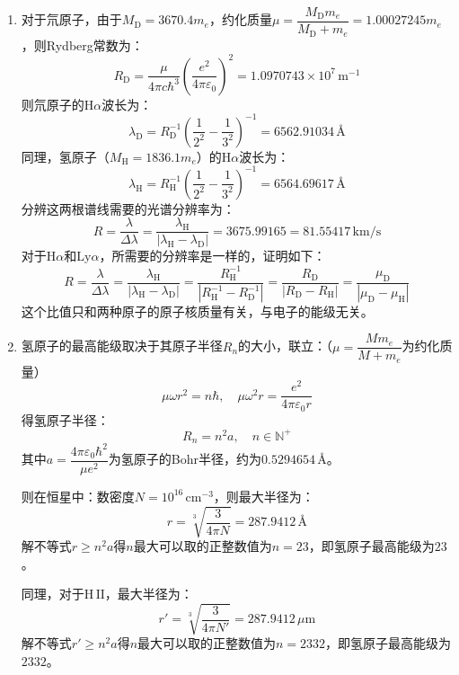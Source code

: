 \documentclass[a4paper]{article}
\renewcommand\epsilon\varepsilon
\begin{document}
\begin{enumerate}
    \bigskip
    \item[5.]
    对于氘原子，由于$M_\mathrm{D} = 3670.4m_e$，约化质量$\mu = \dfrac{M_\mathrm{D} m_e}{M_\mathrm{D} + m_e}=1.00027245m_e$，则Rydberg常数为：
    \[
        R_\mathrm{D} = \frac{\mu}{4\pi c\hbar^3}\left(\frac{e^2}{4\pi\epsilon_0}\right)^{\!2} = 1.0970743\times10^{7}\,\mathrm{m}^{-1}
    \]
    则氘原子的$\mathrm{H}\alpha$波长为：
    \[
        \lambda_\mathrm{D} = R_\mathrm{D}^{-1}\left(\frac{1}{2^2} - \frac{1}{3^2}\right)^{-1} = 6562.91034\,\text{\AA}
    \]
    同理，氢原子（$M_\mathrm{H}=1836.1m_e$）的$\mathrm{H}\alpha$波长为：
    \[
        \lambda_\mathrm{H} = R_\mathrm{H}^{-1}\left(\frac{1}{2^2} - \frac{1}{3^2}\right)^{-1} = 6564.69617\,\text{\AA}
    \]
    分辨这两根谱线需要的光谱分辨率为：
    \[
        R = \frac{\lambda}{\Delta\lambda} = \frac{\lambda_\mathrm{H}}{|\lambda_\mathrm{H} - \lambda_\mathrm{D}|} = 3675.99165 = 81.55417\,\mathrm{km/s}
    \]
    对于$\mathrm{H}\alpha$和$\mathrm{Ly}\alpha$，所需要的分辨率是一样的，证明如下：
    \[
        R = \frac{\lambda}{\Delta\lambda} = \frac{\lambda_\mathrm{H}}{|\lambda_\mathrm{H} - \lambda_\mathrm{D}|} = \frac{R_\mathrm{H}^{-1}}{|R_\mathrm{H}^{-1} - R_\mathrm{D}^{-1}|} = \frac{R_\mathrm{D}}{|R_\mathrm{D} - R_\mathrm{H}|} = \frac{\mu_\mathrm{D}}{|\mu_\mathrm{D} - \mu_\mathrm{H}|}
    \]
    这个比值只和两种原子的原子核质量有关，与电子的能级无关。

    \bigskip
    \item[6.]
    氢原子的最高能级取决于其原子半径$R_n$的大小，联立：（$\mu=\dfrac{M m_e}{M + m_e}$为约化质量）
    \[
        \mu\omega r^2 = n\hbar,\quad
        \mu\omega^2 r = \frac{e^2}{4\pi\epsilon_0 r}
    \]
    得氢原子半径：
    \[
        R_n = n^2 a,\quad
        n \in \mathbb{N}^+
    \]
    其中$a = \dfrac{4\pi\epsilon_0 \hbar^2}{\mu e^2}$为氢原子的Bohr半径，约为$0.5294654\,\text{\AA}$。

    则在恒星中：数密度$N = 10^{16}\,\mathrm{cm^{-3}}$，则最大半径为：
    \[
        r = \sqrt[3]{\frac{3}{4\pi N}} = 287.9412\,\text{\AA}
    \]
    解不等式$r \geqslant n^2 a$得$n$最大可以取的正整数值为$n=23$，即氢原子最高能级为$23$。

    同理，对于$\mathrm{H\,II}$，最大半径为：
    \[
        r' = \sqrt[3]{\frac{3}{4\pi N'}} = 287.9412\,\mu\mathrm{m}
    \]
    解不等式$r' \geqslant n^2 a$得$n$最大可以取的正整数值为$n=2332$，即氢原子最高能级为$2332$。

\end{enumerate}
\end{document}

